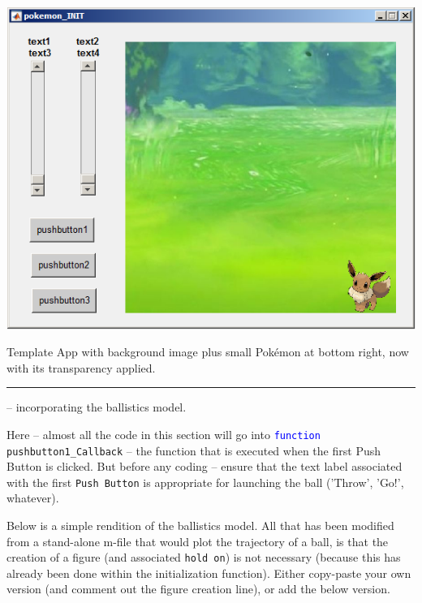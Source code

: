 \documentclass{tufte-book} %
\begin{document}
\begin{marginfigure}[0.0in]
\includegraphics[width=\linewidth]{chGUI-Pokemon5.png}
\caption{Template App with background image plus small Pok\'emon at bottom right, now with its transparency applied.}
\label{fig:chGUI-Pokemon5}
\end{marginfigure}

\vspace{1mm}
\noindent\rule{4cm}{0.5pt}
\vspace{-2mm}

 -- incorporating the ballistics model.

\noindent Here -- almost all the code in this section will go into \texttt{\textcolor{blue}{function} \\\noindent pushbutton1\_Callback} -- the function that is executed when the first \textsf{Push Button} is clicked. But before any coding -- ensure that the text label associated with the first \texttt{Push Button} is appropriate for launching the ball ('Throw', 'Go!', whatever).

Below is a simple rendition of the ballistics model. All that has been modified from a stand-alone \textsf{m-file} that would plot the trajectory of a ball, is that the creation of a figure (and associated \texttt{hold on}) is not necessary (because this has already been done within the initialization function). Either copy-paste your own version (and comment out the figure creation line), or add the below version.
\end{document}
